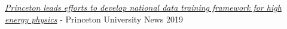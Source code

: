 \documentclass[10pt, letterpaper]{fulldeps}
\begin{document}
\begin{tightitemize}
\item \textit{\href{https://www.princeton.edu/news/2019/08/19/princeton-leads-efforts-develop-national-data-training-framework-high-energy}{Princeton leads efforts to develop national data training framework for high energy physics}} - Princeton University News \hfill{2019}
\end{tightitemize}
\end{document}
